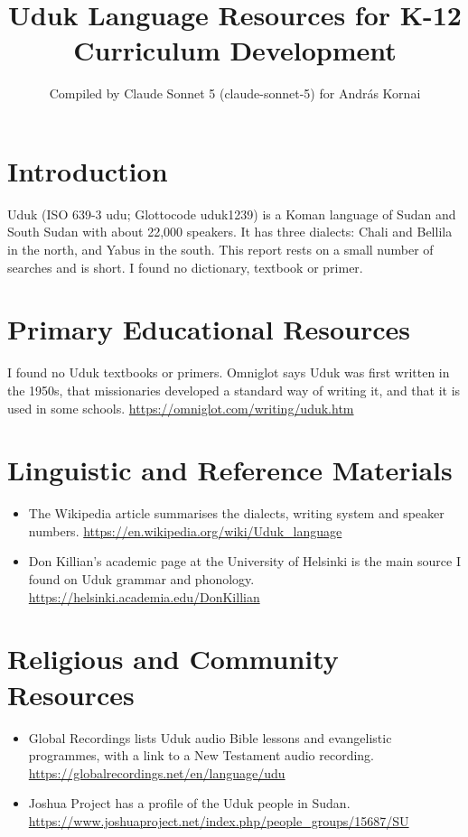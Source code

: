 \documentclass[12pt]{article}
\title{Uduk Language Resources for K-12 Curriculum Development}
\author{Compiled by Claude Sonnet 5 (claude-sonnet-5) for Andr\'as Kornai}
\date{}
\begin{document}
\maketitle

\section{Introduction}
Uduk (ISO 639-3 udu; Glottocode uduk1239) is a Koman language of Sudan and South Sudan with about 22,000 speakers. It has three dialects: Chali and Bellila in the north, and Yabus in the south. This report rests on a small number of searches and is short. I found no dictionary, textbook or primer.

\section{Primary Educational Resources}
I found no Uduk textbooks or primers. Omniglot says Uduk was first written in the 1950s, that missionaries developed a standard way of writing it, and that it is used in some schools. \url{https://omniglot.com/writing/uduk.htm}

\section{Linguistic and Reference Materials}
\begin{itemize}
\item The Wikipedia article summarises the dialects, writing system and speaker numbers. \url{https://en.wikipedia.org/wiki/Uduk_language}
\item Don Killian's academic page at the University of Helsinki is the main source I found on Uduk grammar and phonology. \url{https://helsinki.academia.edu/DonKillian}
\end{itemize}

\section{Religious and Community Resources}
\begin{itemize}
\item Global Recordings lists Uduk audio Bible lessons and evangelistic programmes, with a link to a New Testament audio recording. \url{https://globalrecordings.net/en/language/udu}
\item Joshua Project has a profile of the Uduk people in Sudan. \url{https://www.joshuaproject.net/index.php/people_groups/15687/SU}
\end{itemize}
\end{document}

